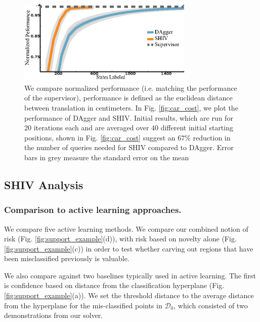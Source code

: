 \documentclass[10pt, conference]{ieeeconf}      %
\begin{document}
\begin{figure}[t!]
\centering
\includegraphics[width=\columnwidth, height=4cm]{figures/needle_insertion_results.eps}
\caption{ \footnotesize We compare normalized performance (i.e. matching the performance of the supervisor), performance is defined as the euclidean distance between translation in centimeters. In Fig. \ref{fig:car_cost}, we plot the performance of DAgger and SHIV.  Initial results, which are run for 20 iterations each and are averaged over 40 different initial starting positions, shown in Fig. \ref{fig:car_cost} suggest an $67\%$ reduction in the number of queries needed for SHIV compared to DAgger. Error bars in grey measure the standard error on the mean}
\vspace*{-20pt}
\label{fig:needle}
\end{figure}


\subsection{SHIV Analysis}\label{sec:car}



\subsubsection{Comparison to active learning approaches.}

 We compare five active learning methods. We compare our combined notion of risk (Fig. \ref{fig:support_example}(d)), with risk based on novelty alone (Fig. \ref{fig:support_example}(c)) in order to test whether carving out regions that have been misclassified previously is valuable. 

We also compare against two baselines typically used in active learning. The first is confidence based on distance from the classification hyperplane \cite{tong2002support} (Fig. \ref{fig:support_example}(a)). We set the threshold distance to the average distance from the hyperplane for the mis-classified points in $\mathcal{D}_0$, which consisted of two demonstrations from our solver. 
\end{document}
